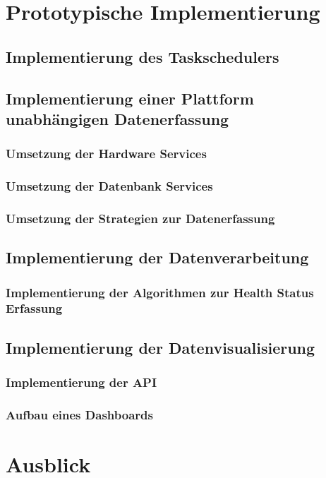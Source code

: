 \chapter{Prototypische Implementierung}

\section{Implementierung des Taskschedulers}

\section{Implementierung einer Plattform unabhängigen Datenerfassung}
\subsection{Umsetzung der Hardware Services}
\subsection{Umsetzung der Datenbank Services}
\subsection{Umsetzung der Strategien zur Datenerfassung}

\section{Implementierung der Datenverarbeitung}
\subsection{Implementierung der Algorithmen zur Health Status Erfassung}

\section{Implementierung der Datenvisualisierung}
\subsection{Implementierung der API}
\subsection{Aufbau eines Dashboards}


\chapter{Ausblick}